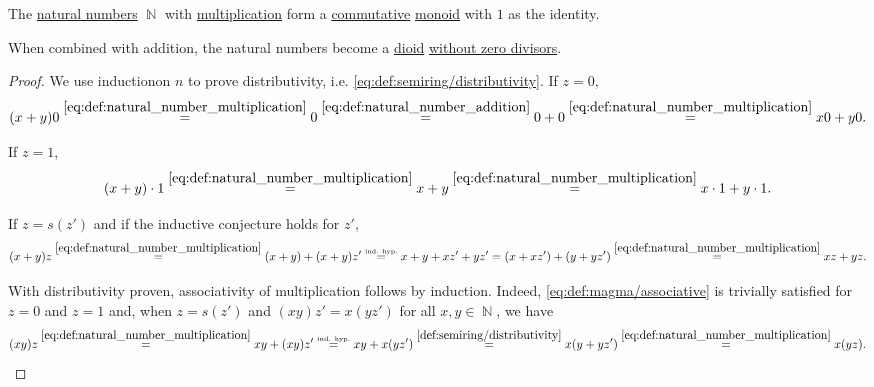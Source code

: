\begin{proposition}\label{thm:natural_numbers_form_dioid}
  The \hyperref[def:natural_numbers]{natural numbers} \( \BbbN \) with \hyperref[def:natural_number_multiplication]{multiplication} form a \hyperref[def:magma/commutative]{commutative} \hyperref[def:unital_magma/associative]{monoid} with \( 1 \) as the identity.

  When combined with addition, the natural numbers become a \hyperref[def:semiring]{dioid} \hyperref[def:semiring/no_zero_divisor]{without zero divisors}.
\end{proposition}
\begin{proof}
   We use induction\IND on \( n \) to prove distributivity, i.e. \eqref{eq:def:semiring/distributivity}. If \( z = 0 \),
  \begin{equation*}
    (x + y)0
    \overset{\eqref{eq:def:natural_number_multiplication}} =
    0
    \overset{\eqref{eq:def:natural_number_addition}} =
    0 + 0
    \overset{\eqref{eq:def:natural_number_multiplication}} =
    x0 + y0.
  \end{equation*}

  If \( z = 1 \),
  \begin{equation*}
    (x + y) \cdot 1
    \overset{\eqref{eq:def:natural_number_multiplication}} =
    x + y
    \overset{\eqref{eq:def:natural_number_multiplication}} =
    x \cdot 1 + y \cdot 1.
  \end{equation*}

  If \( z = s(z') \) and if the inductive conjecture holds for \( z' \),
  \begin{equation*}
    (x + y)z
    \overset{\eqref{eq:def:natural_number_multiplication}} =
    (x + y) + (x + y) z'
    \overset {\scriptscriptstyle{\text{ind. hyp.}}} =
    x + y + xz' + yz'
    =
    (x + xz') + (y + yz')
    \overset{\eqref{eq:def:natural_number_multiplication}} =
    xz + yz.
  \end{equation*}

   With distributivity proven, associativity of multiplication follows by induction\IND. Indeed, \eqref{eq:def:magma/associative} is trivially satisfied for \( z = 0 \) and \( z = 1 \) and, when \( z = s(z') \) and \( (xy)z' = x(yz') \) for all \( x, y \in \BbbN \), we have
  \begin{equation*}
    (xy)z
    \overset{\eqref{eq:def:natural_number_multiplication}} =
    xy + (xy) z'
    \overset {\scriptscriptstyle{\text{ind. hyp.}}} =
    xy + x(y z')
    \overset{\ref{def:semiring/distributivity}} =
    x(y + y z')
    \overset{\eqref{eq:def:natural_number_multiplication}} =
    x(yz).
  \end{equation*}


\end{proof}
